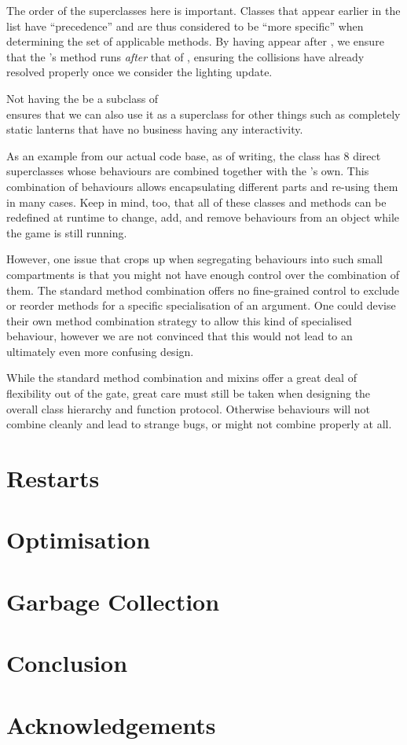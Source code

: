 \documentclass[a4paper]{paper}
\begin{document}
The order of the superclasses here is important. Classes that appear earlier in the list have ``precedence'' and are thus considered to be ``more specific'' when determining the set of applicable methods. By having  appear after , we ensure that the 's  method runs \textit{after} that of , ensuring the collisions have already resolved properly once we consider the lighting update.

Not having the  be a subclass of \\ ensures that we can also use it as a superclass for other things such as completely static lanterns that have no business having any interactivity.

As an example from our actual code base, as of writing, the  class has 8 direct superclasses whose behaviours are combined together with the 's own. This combination of behaviours allows encapsulating different parts and re-using them in many cases. Keep in mind, too, that all of these classes and methods can be redefined at runtime to change, add, and remove behaviours from an object while the game is still running.

However, one issue that crops up when segregating behaviours into such small compartments is that you might not have enough control over the combination of them. The standard method combination offers no fine-grained control to exclude or reorder methods for a specific specialisation of an argument. One could devise their own method combination strategy to allow this kind of specialised behaviour, however we are not convinced that this would not lead to an ultimately even more confusing design.

While the standard method combination and mixins offer a great deal of flexibility out of the gate, great care must still be taken when designing the overall class hierarchy and function protocol. Otherwise behaviours will not combine cleanly and lead to strange bugs, or might not combine properly at all.

\section{Restarts}


\section{Optimisation}


\section{Garbage Collection}


\section{Conclusion}


\section{Acknowledgements}



\end{document}
